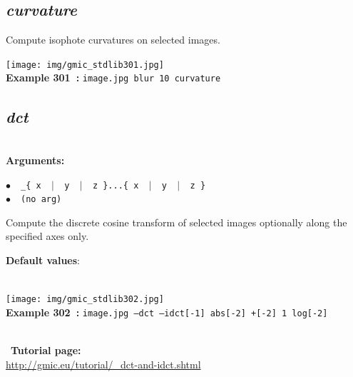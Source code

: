 \documentclass[a4paper,10.5pt,twoside]{book}
\def\comma{\discretionary{,}{}{,}}
\newcommand{\Cb}[1]{\textcolor{cb}{#1}}
\newcommand{\Cc}[1]{\textcolor{cc}{#1}}
\begin{document}
\subsection{\emph{curvature} }\vspace*{-0.7em}
Compute isophote curvatures on selected images.
\begin{center}\texttt{[image: img/gmic\_stdlib301.jpg]}\\
{\footnotesize \textbf{Example 301~:} \texttt{image.jpg blur 10 curvature}}
\end{center}

\subsection{\emph{dct} }\vspace*{-0.7em}
~\\\textbf{\Cb{Arguments: }}\begin{flushleft}
{\small \Cb{\hspace*{0.5cm}$\bullet$~~\texttt{\_\{ x ~$|$~ y ~$|$~ z \}...\{ x ~$|$~ y ~$|$~ z \}}}}~~~\\
{\small \Cb{\hspace*{0.5cm}$\bullet$~~\texttt{(no arg)}}}\end{flushleft}
Compute the discrete cosine transform of selected images{\comma}
optionally along the specified axes only.
\begin{flushleft}\Cc{\textbf{Default values}:\\~\\\hspace*{0.5cm}{\small $\bullet$~~\texttt{(no arg)}}}\end{flushleft}
\begin{center}\texttt{[image: img/gmic\_stdlib302.jpg]}\\
{\footnotesize \textbf{Example 302~:} \texttt{image.jpg --dct --idct[-1] abs[-2] +[-2] 1 log[-2]}}
\end{center}
~\\
~\textbf{Tutorial page: }\\\url{http://gmic.eu/tutorial/\_dct-and-idct.shtml}
\end{document}
